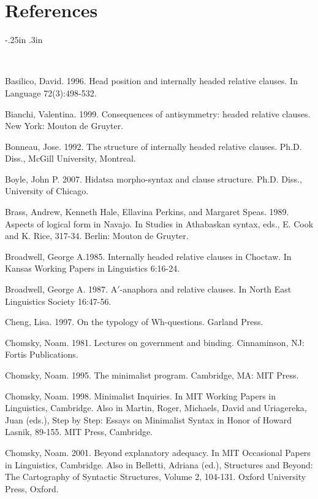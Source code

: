 \documentclass[output=paper]{LSP/langsci}
\begin{document}
\section*{References} 

\newenvironment{reflist} {\begin{list} {} {\listparindent -.25in
\leftmargin .3in} \item \ \vspace{-.3in} } {\end{list} }

\begin{reflist}


Basilico, David. 1996. Head position and internally headed relative clauses. In Language 72(3):498-532.

Bianchi, Valentina. 1999. Consequences of antisymmetry: headed relative clauses. New York: Mouton de Gruyter.

Bonneau, Jose. 1992. The structure of internally headed relative clauses.  Ph.D. Diss., McGill University, Montreal.

Boyle, John P. 2007. Hidatsa morpho-syntax and clause structure. Ph.D. Diss., University of Chicago.

Brass, Andrew, Kenneth Hale, Ellavina Perkins, and Margaret Speas. 1989. Aspects of logical form in Navajo. In Studies in Athabaskan syntax, eds., E. Cook and K. Rice, 317-34. Berlin: Mouton de Gruyter.

Broadwell, George A.1985. Internally headed relative clauses in Choctaw. In Kansas Working Papers in Linguistics 6:16-24.

Broadwell, George A. 1987. A$'$-anaphora and relative clauses. In North East Linguistics Society 16:47-56.

Cheng, Lisa. 1997. On the typology of Wh-questions. Garland Press.

Chomsky, Noam. 1981. Lectures on government and binding. Cinnaminson, NJ: Fortis Publications.

Chomsky, Noam. 1995. The minimalist program. Cambridge, MA: MIT Press.

Chomsky, Noam. 1998. Minimalist Inquiries. In MIT Working Papers in Linguistics, Cambridge. Also in Martin, Roger, Michaels, David and Uriagereka, Juan (eds.), Step by Step: Essays on Minimalist Syntax in Honor of Howard Lasnik, 89-155. MIT Press, Cambridge.  

Chomsky, Noam. 2001. Beyond explanatory adequacy. In MIT Occasional Papers in Linguistics, Cambridge. Also in Belletti, Adriana (ed.), Structures and Beyond: The Cartography of Syntactic Structures, Volume 2, 104-131. Oxford University Press, Oxford.


\end{reflist}
\end{document}
